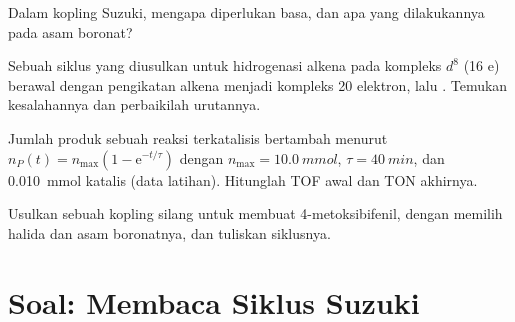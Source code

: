 \begin{exercise}[$\star\star$]\label{exo:b2:catalytic-cycles:9}
Dalam kopling Suzuki, mengapa diperlukan basa, dan apa yang dilakukannya pada asam boronat?
\end{exercise}

\begin{exercise}[$\star\star\star$]\label{exo:b2:catalytic-cycles:10}
Sebuah siklus yang diusulkan untuk hidrogenasi alkena pada kompleks $d^8$
 (16 e) berawal dengan pengikatan alkena menjadi kompleks 20
elektron, lalu  . Temukan kesalahannya dan perbaikilah
urutannya.
\end{exercise}

\begin{exercise}[$\star\star\star$]\label{exo:b2:catalytic-cycles:11}
Jumlah produk sebuah reaksi terkatalisis bertambah menurut $n_P(t) = n_{\max}(1 - \mathrm e^{-t/\tau})$
dengan $n_{\max} = \qty{10.0}{mmol}$, $\tau = \qty{40}{min}$, dan \qty{0.010}{mmol}
katalis (data latihan). Hitunglah TOF awal dan TON akhirnya.
\end{exercise}

\begin{exercise}[$\star\star\star$]\label{exo:b2:catalytic-cycles:12}
Usulkan sebuah kopling silang untuk membuat 4-metoksibifenil, dengan memilih
halida dan asam boronatnya, dan tuliskan siklusnya.
\end{exercise}

\section{Soal: Membaca Siklus Suzuki}

